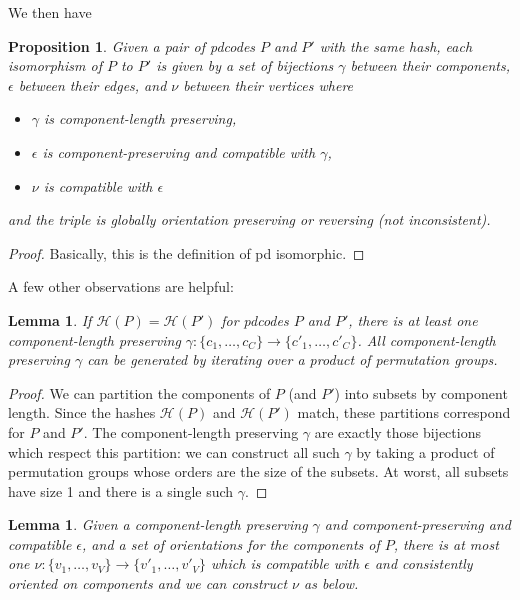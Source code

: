 \documentclass[amsmath,secnumarabic,floatfix,amssymb,nofootinbib,nobibnotes,letterpaper,11pt,tightenlines,showkeys]{revtex4}
\newtheorem{lemma}[theorem]{Lemma}
\newtheorem{proposition}[theorem]{Proposition}
\theoremstyle{definition}
\begin{document}
We then have
\begin{proposition}
Given a pair of pdcodes $P$ and $P'$ with the same hash, each isomorphism of $P$ to $P'$ is given by a set of bijections $\gamma$ between their components, $\epsilon$ between their edges, and $\nu$ between their vertices where
\begin{itemize}
\item $\gamma$ is component-length preserving,
\item $\epsilon$ is component-preserving and compatible with $\gamma$,
\item $\nu$ is compatible with $\epsilon$
\end{itemize}
and the triple is globally orientation preserving or reversing (not inconsistent).
\end{proposition}

\begin{proof}
Basically, this is the definition of pd isomorphic.
\end{proof}

A few other observations are helpful:
\begin{lemma}
If $\mathcal{H}(P) = \mathcal{H}(P')$ for pdcodes $P$ and $P'$, there is at least one component-length preserving $\gamma : \{c_1,\dots,c_C\} \rightarrow \{c'_1,\dots,c'_C\}$. All component-length preserving $\gamma$ can be generated by iterating over a product of permutation groups.
\end{lemma}

\begin{proof}
We can partition the components of $P$ (and $P'$) into subsets by component length. Since the hashes $\mathcal{H}(P)$ and $\mathcal{H}(P')$ match, these partitions correspond for $P$ and $P'$. The component-length preserving $\gamma$ are exactly those bijections which respect this partition: we can construct all such $\gamma$ by taking a product of permutation groups whose orders are the size of the subsets. At worst, all subsets have size 1 and there is a single such $\gamma$.
\end{proof}

\begin{lemma}
Given a component-length preserving $\gamma$ and component-preserving and compatible $\epsilon$, and a set of orientations for the components of $P$, there is at most one $\nu : \{v_1, \dots, v_V\} \rightarrow \{v'_1,\dots,v'_V\}$ which is compatible with $\epsilon$ and consistently oriented on components and we can construct $\nu$ as below.
\end{lemma}
\end{document}
